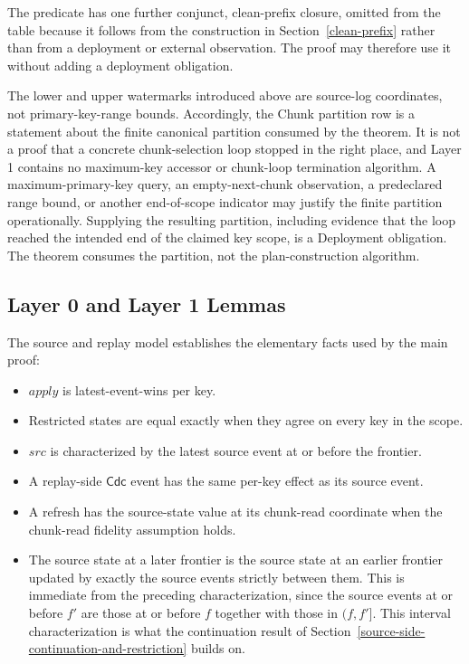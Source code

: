 \documentclass[letterpaper,10pt,twocolumn]{article}
\newcommand{\Apply}{\mathit{apply}}
\newcommand{\Src}{\mathit{src}}
\providecommand{\tightlist}{\setlength{\itemsep}{0pt}\setlength{\parskip}{0pt}}
\begin{document}
The predicate has one further conjunct, clean-prefix closure, omitted
from the table because it follows from the construction in
Section~\ref{clean-prefix} rather than from a deployment or external
observation. The proof may therefore use it without adding a deployment
obligation.

The lower and upper watermarks introduced above are source-log
coordinates, not primary-key-range bounds. Accordingly, the Chunk
partition row is a statement about the finite canonical partition
consumed by the theorem. It is not a proof that a concrete
chunk-selection loop stopped in the right place, and Layer 1 contains no
maximum-key accessor or chunk-loop termination algorithm. A
maximum-primary-key query, an empty-next-chunk observation, a
predeclared range bound, or another end-of-scope indicator may justify the
finite partition operationally. Supplying the resulting partition,
including evidence that the loop reached the intended end of the
claimed key scope, is a Deployment obligation. The theorem consumes the
partition, not the plan-construction algorithm.

\subsection{Layer 0 and Layer 1
Lemmas}\label{layer-0-and-layer-1-lemmas}

The source and replay model establishes the elementary facts used by the
main proof:

\begin{itemize}\tightlist
\item $\Apply$ is latest-event-wins per key.
\item Restricted states are equal exactly when they agree on every key
  in the scope.
\item $\Src$ is characterized by the latest source event at or before
  the frontier.
\item A replay-side $\mathsf{Cdc}$ event has the same per-key effect as
  its source event.
\item A refresh has the source-state value at its chunk-read coordinate
  when the chunk-read fidelity assumption holds.
\item The source state at a later frontier is the source state at an
  earlier frontier updated by exactly the source events strictly
  between them. This is immediate from the preceding characterization, since
  the source events at or before $f'$ are those at or before $f$
  together with those in $(f,f']$. This interval characterization is
  what the continuation result of
  Section~\ref{source-side-continuation-and-restriction} builds on.
\end{itemize}
\end{document}

